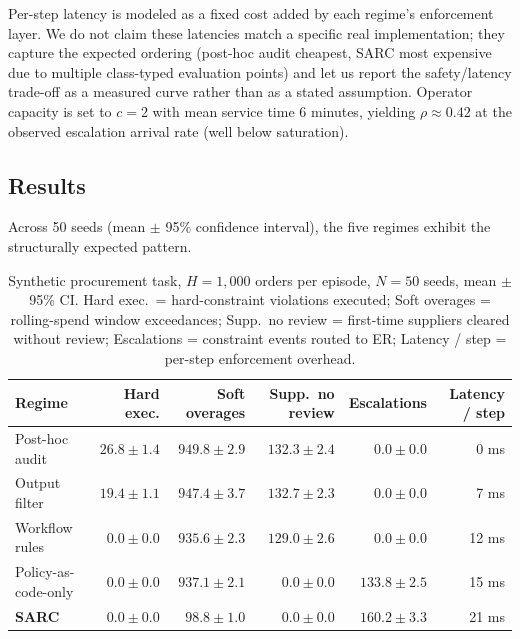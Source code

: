 \documentclass[11pt,a4paper]{article}
\theoremstyle{remark}
\begin{document}
Per-step latency is modeled as a fixed cost added by each regime's enforcement layer. We do not claim these latencies match a specific real implementation; they capture the expected ordering (post-hoc audit cheapest, SARC most expensive due to multiple class-typed evaluation points) and let us report the safety/latency trade-off as a measured curve rather than as a stated assumption. Operator capacity is set to $c=2$ with mean service time 6 minutes, yielding $\rho \approx 0.42$ at the observed escalation arrival rate (well below saturation).

\subsection{Results}\label{sec:sim-results}

Across 50 seeds (mean $\pm$ 95\% confidence interval), the five regimes exhibit the structurally expected pattern.

\begin{table}[!htbp]
\centering\footnotesize
\begin{tabular}{@{}lrrrrr@{}}
\toprule
\textbf{Regime} & \textbf{Hard exec.} & \textbf{Soft overages} & \textbf{Supp.\ no review} & \textbf{Escalations} & \textbf{Latency / step} \\
\midrule
Post-hoc audit       & $26.8 \pm 1.4$  & $949.8 \pm 2.9$ & $132.3 \pm 2.4$ & $0.0 \pm 0.0$    &  0 ms \\
Output filter        & $19.4 \pm 1.1$  & $947.4 \pm 3.7$ & $132.7 \pm 2.3$ & $0.0 \pm 0.0$    &  7 ms \\
Workflow rules       & $0.0 \pm 0.0$   & $935.6 \pm 2.3$ & $129.0 \pm 2.6$ & $0.0 \pm 0.0$    & 12 ms \\
Policy-as-code-only  & $0.0 \pm 0.0$   & $937.1 \pm 2.1$ & $0.0 \pm 0.0$   & $133.8 \pm 2.5$  & 15 ms \\
\textbf{SARC}        & $0.0 \pm 0.0$   & $\mathbf{98.8 \pm 1.0}$ & $0.0 \pm 0.0$ & $160.2 \pm 3.3$ & 21 ms \\
\bottomrule
\end{tabular}
\caption{Synthetic procurement task, $H = 1{,}000$ orders per episode, $N = 50$ seeds, mean $\pm$ 95\% CI. Hard exec.\ = hard-constraint violations executed; Soft overages = rolling-spend window exceedances; Supp.\ no review = first-time suppliers cleared without review; Escalations = constraint events routed to ER; Latency / step = per-step enforcement overhead.}
\label{tab:sim}
\end{table}
\end{document}
